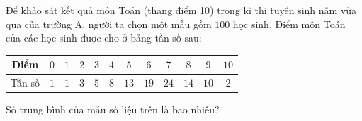 \begin{ex}
Để khảo sát kết quả môn Toán (thang điểm 10) trong kì thi tuyển sinh năm vừa qua của trường A, người ta chọn một mẫu gồm $100$ học sinh. Điểm môn Toán của các học sinh được cho ở bảng tần số sau:
\begin{center}
\begin{tabular}{|c|c|c|c|c|c|c|c|c|c|c|c|}\hline
Điểm & $0$ & $1$ & $2$ & $3$ & $4$ & $5$ & $6$ & $7$ & $8$ & $9$ & $10$\\\hline
Tần số & $1$ & $1$ & $3$ & $5$ & $8$ & $13$ & $19$ & $24$ & $14$ & $10$ & $2$\\\hline
\end{tabular}
\end{center}
Số trung bình của mẫu số liệu trên là bao nhiêu?
\end{ex}
